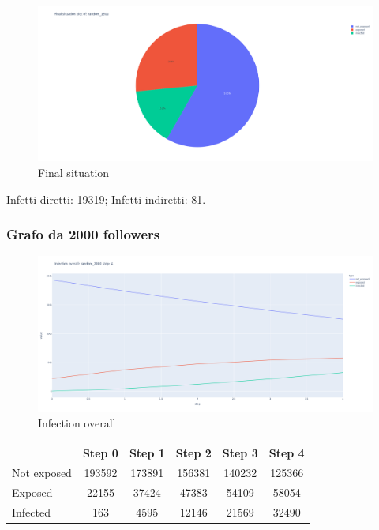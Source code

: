         \begin{figure}[H]
            \includegraphics[width=16cm]{resources/charts/random_1500_pie.png}
            \caption{Final situation}
            \label{fig:random_1500_pie}
        \end{figure}
        Infetti diretti: 19319; \newline
        Infetti indiretti: 81.
        
    
    \subsubsection{Grafo da 2000 followers}
        \begin{figure}[H]
            \includegraphics[width=16cm]{resources/charts/random_2000_line.png}
            \caption{Infection overall}
            \label{fig:random_2000_line}
        \end{figure}
        
        \begin{table}[H]
            \centering
            \begin{tabular}{|l|c|c|c|c|c|}
            \hline
                        & Step 0 & Step 1 & Step 2 & Step 3 & Step 4 \\ \hline
            Not exposed & 193592 & 173891 & 156381 & 140232 & 125366 \\ \hline
            Exposed     & 22155  & 37424  & 47383  & 54109  & 58054  \\ \hline
            Infected    & 163    & 4595   & 12146  & 21569  & 32490  \\ \hline
            \end{tabular}
        \end{table}
        
